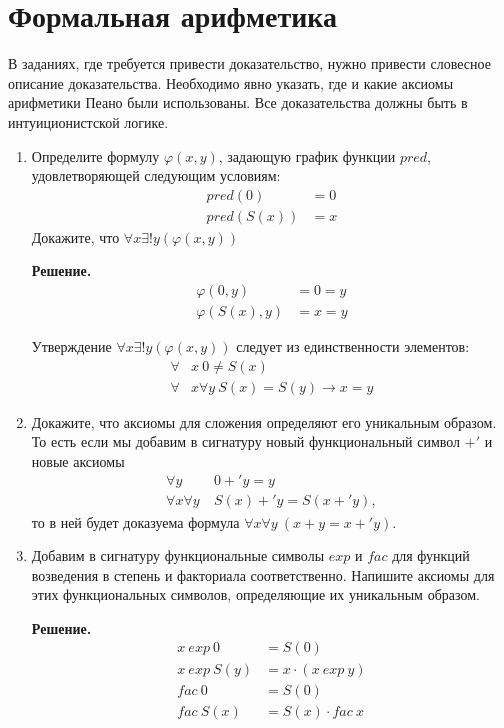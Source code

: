 \section*{Формальная арифметика}

В заданиях, где требуется привести доказательство, нужно привести словесное описание доказательства.
Необходимо явно указать, где и какие аксиомы арифметики Пеано были использованы.
Все доказательства должны быть в интуиционистской логике.
\begin{enumerate}
	
\item Определите формулу $\varphi(x,y)$, задающую график функции $pred$, удовлетворяющей следующим условиям:
\begin{align*}
pred(0) & = 0 \\
pred(S(x)) & = x
\end{align*}
Докажите, что $\forall x \exists! y (\varphi(x,y))$

\textbf{Решение.}
\begin{align*}
	\varphi(0, y) &= 0 = y \\
	\varphi(S(x), y) &= x = y
\end{align*}

Утверждение $\forall x \exists! y (\varphi(x,y))$ следует из единственности элементов:
\begin{align*}
	\forall &x \ 0 \neq S(x)\\
	\forall &x \forall y \ S(x) = S(y) \to x = y
\end{align*}

\item Докажите, что аксиомы для сложения определяют его уникальным образом.
    То есть если мы добавим в сигнатуру новый функциональный символ $+'$ и новые аксиомы
\begin{align*}
\forall y\ & 0 +' y = y \tag{$+'0$} \\
\forall x \forall y\ & S(x) +' y = S(x +' y) \tag{$+'S$},
\end{align*}
то в ней будет доказуема формула $\forall x \forall y\ (x + y = x +' y)$.

\item Добавим в сигнатуру функциональные символы $exp$ и $fac$ для функций возведения в степень и факториала
соответственно.
    Напишите аксиомы для этих функциональных символов, определяющие их уникальным образом.

	\textbf{Решение.}
	\begin{align*}
		x \ exp \ 0 &= S(0)\\
		x \ exp \ S(y) &= x \cdot (x \ exp\ y) \\ 
		fac \ 0 &= S(0) \\
		fac \ S(x) &= S(x) \cdot fac\ x
	\end{align*}
	


\end{enumerate}

